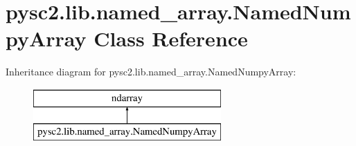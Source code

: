 \hypertarget{classpysc2_1_1lib_1_1named__array_1_1_named_numpy_array}{}\section{pysc2.\+lib.\+named\+\_\+array.\+Named\+Numpy\+Array Class Reference}
\label{classpysc2_1_1lib_1_1named__array_1_1_named_numpy_array}
Inheritance diagram for pysc2.\+lib.\+named\+\_\+array.\+Named\+Numpy\+Array\+:\begin{figure}[H]
\begin{center}
\leavevmode
\includegraphics[height=2.000000cm]{classpysc2_1_1lib_1_1named__array_1_1_named_numpy_array}
\end{center}
\end{figure}
